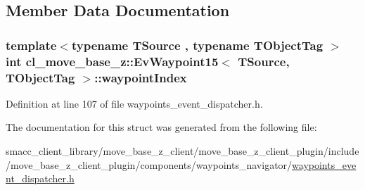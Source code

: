 \subsection{Member Data Documentation}
\subsubsection[{\texorpdfstring{waypoint\+Index}{waypointIndex}}]{\setlength{\rightskip}{0pt plus 5cm}template$<$typename T\+Source , typename T\+Object\+Tag $>$ int {\bf cl\+\_\+move\+\_\+base\+\_\+z\+::\+Ev\+Waypoint15}$<$ T\+Source, T\+Object\+Tag $>$\+::waypoint\+Index}\hypertarget{structcl__move__base__z_1_1EvWaypoint15_a227d0c43ea33af9e1033a959a9900604}{}\label{structcl__move__base__z_1_1EvWaypoint15_a227d0c43ea33af9e1033a959a9900604}


Definition at line 107 of file waypoints\+\_\+event\+\_\+dispatcher.\+h.



The documentation for this struct was generated from the following file\+:\begin{DoxyCompactItemize}
\item 
smacc\+\_\+client\+\_\+library/move\+\_\+base\+\_\+z\+\_\+client/move\+\_\+base\+\_\+z\+\_\+client\+\_\+plugin/include/move\+\_\+base\+\_\+z\+\_\+client\+\_\+plugin/components/waypoints\+\_\+navigator/\hyperlink{waypoints__event__dispatcher_8h}{waypoints\+\_\+event\+\_\+dispatcher.\+h}\end{DoxyCompactItemize}
